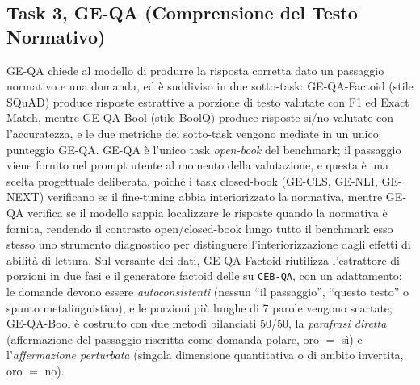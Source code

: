 \documentclass[pdflatex, sn-apa]{sn-jnl}%
\theoremstyle{thmstyleone}%
\theoremstyle{thmstyletwo}%
\theoremstyle{thmstylethree}%
\begin{document}
\subsection{Task 3, GE-QA (Comprensione del Testo Normativo)}
\label{sec:bench:qa}
GE-QA chiede al modello di produrre la risposta corretta dato un passaggio
normativo e una domanda, ed è suddiviso in due sotto-task: GE-QA-Factoid (stile
SQuAD) produce risposte estrattive a porzione di testo valutate con F1 ed Exact
Match, mentre GE-QA-Bool (stile BoolQ) produce risposte sì/no valutate con
l'accuratezza, e le due metriche dei sotto-task vengono mediate in un unico
punteggio GE-QA. GE-QA è l'unico task \emph{open-book} del benchmark; il passaggio
viene fornito nel prompt utente al momento della valutazione, e questa è una
scelta progettuale deliberata, poiché i task closed-book (GE-CLS, GE-NLI, GE-NEXT)
verificano se il fine-tuning abbia interiorizzato la normativa, mentre GE-QA
verifica se il modello sappia localizzare le risposte quando la normativa è
fornita, rendendo il contrasto open/closed-book lungo tutto il benchmark esso
stesso uno strumento diagnostico per distinguere l'interiorizzazione dagli effetti
di abilità di lettura. Sul versante dei dati, GE-QA-Factoid riutilizza
l'estrattore di porzioni in due fasi e il generatore factoid delle
 su \texttt{CEB-QA}, con un adattamento: le
domande devono essere \emph{autoconsistenti} (nessun ``il passaggio'', ``questo
testo'' o spunto metalinguistico), e le porzioni più lunghe di 7 parole vengono
scartate; GE-QA-Bool è costruito con due metodi bilanciati 50/50, la
\emph{parafrasi diretta} (affermazione del passaggio riscritta come domanda
polare, oro $=$ sì) e l'\emph{affermazione perturbata} (singola dimensione
quantitativa o di ambito invertita, oro $=$ no).



\end{document}

